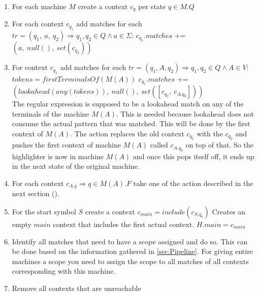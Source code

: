 	\begin{enumerate}
	\item For each machine $M$ create a context $c_q$ per state $q \in M.Q$
	\item For each context $c_{q_1}$ add matches for each $tr=(q_1,\ a,\ q_2) \Rightarrow q_1, q_2 \in Q \land a \in \Sigma$:
		\subitem $c_{q_1}.matches$ += $(a,\ null(),\ set(c_{q_2}))$
	\item For context $c_{q_1}$ add matches for each $tr=(q_1, A, q_2) \Rightarrow q_1, q_2 \in Q \land A \in V$:
		\subitem $tokens = firstTerminalsOf(M(A))$
		\subitem $c_{q_1}.matches$ += $(lookahead(any(tokens)),\ null(),\ set([c_{q_2},\ c_{A.q_0}]))$\vspace{0.05in}\\
		The regular expression is supposed to be a lookahead match on any of the terminals of the machine $M(A)$. This is needed because lookahead does not consume the actual pattern that was matched. This will be done by the first context of $M(A)$. The action replaces the old context $c_{q_1}$ with the $c_{q_2}$ and pushes the first context of machine $M(A)$ called $c_{A.{q_0}}$ on top of that. So the highlighter is now in machine $M(A)$ and once this pops itself off, it ends up in the next state of the original machine. 
	\item For each context $c_{A.q} \Rightarrow q \in M(A).F$ take one of the action described in the next section ().
	\item For the start symbol $S$ create a context $c_{main} = include(c_{S.{q_0}})$
		\subitem Creates an empty $main$ context that includes the first actual context.
		\subitem $H.main = c_{main}$
	\item Identify all matches that need to have a scope assigned and do so. This can be done based on the information gathered in \ref{sec:Pipeline}. For giving entire machines a scope you need to assign the scope to all matches of all contexts corresponding with this machine.
	\item Remove all contexts that are unreachable
	\end{enumerate}
	
	\pagebreak
	
